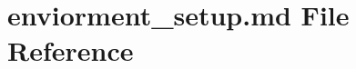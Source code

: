 \hypertarget{docs_2enviorment__setup_8md}{}\section{enviorment\+\_\+setup.\+md File Reference}
\label{docs_2enviorment__setup_8md}
